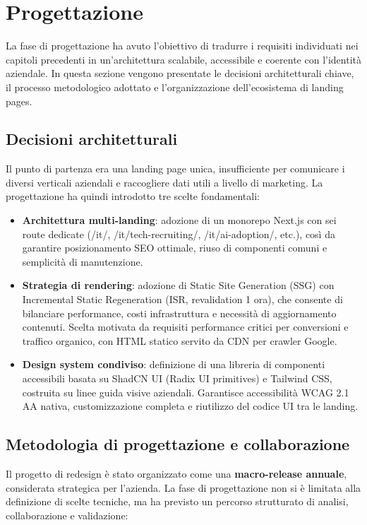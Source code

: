 \chapter{Progettazione}

La fase di progettazione ha avuto l'obiettivo di tradurre i requisiti individuati
nei capitoli precedenti in un'architettura scalabile, accessibile e coerente con
l'identità aziendale. In questa sezione vengono presentate le decisioni
architetturali chiave, il processo metodologico adottato e l'organizzazione
dell'ecosistema di landing pages.

\section{Decisioni architetturali}
Il punto di partenza era una landing page unica, insufficiente per comunicare i
diversi verticali aziendali e raccogliere dati utili a livello di marketing. La
progettazione ha quindi introdotto tre scelte fondamentali:

\begin{itemize}
  \item \textbf{Architettura multi-landing}: adozione di un monorepo Next.js con sei
  route dedicate (/it/, /it/tech-recruiting/, /it/ai-adoption/, etc.), così da garantire 
  posizionamento SEO ottimale, riuso di componenti comuni e semplicità di manutenzione. 
  
  \item \textbf{Strategia di rendering}: adozione di Static Site Generation (SSG) 
  con Incremental Static Regeneration (ISR, revalidation 1 ora), che consente di 
  bilanciare performance, costi infrastruttura e 
  necessità di aggiornamento contenuti. Scelta motivata da requisiti performance 
  critici per conversioni e traffico organico, con HTML statico servito da CDN 
  per crawler Google.
  
  \item \textbf{Design system condiviso}: definizione di una libreria di componenti 
  accessibili basata su ShadCN UI (Radix UI primitives) e Tailwind CSS, costruita 
  su linee guida visive aziendali. Garantisce accessibilità WCAG 2.1 AA nativa, 
  customizzazione completa e riutilizzo del codice UI tra le landing.
\end{itemize}

\section{Metodologia di progettazione e collaborazione} Il progetto di redesign è stato organizzato come una \textbf{macro-release annuale},
considerata strategica per l'azienda. La fase di progettazione non si è limitata
alla definizione di scelte tecniche, ma ha previsto un percorso strutturato di
analisi, collaborazione e validazione:

